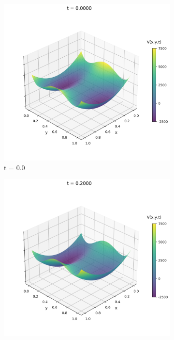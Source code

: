 \documentclass{article}
\theoremstyle{definition}
\theoremstyle{plain}
\theoremstyle{remark}
\begin{document}
\begin{figure}[h]
  \centering
  \begin{subfigure}[b]{0.3\textwidth}
    \centering
    \includegraphics[width=\textwidth, trim=0cm 0cm 0cm 1cm, clip]{figures/potential_frame_0000.png}
    \caption{t = 0.0}
  \end{subfigure}
  \hfill
  \begin{subfigure}[b]{0.3\textwidth}
    \centering
    \includegraphics[width=\textwidth, trim=0cm 0cm 0cm 1cm, clip]{figures/potential_frame_0010.png}

\end{subfigure}
\end{figure}
\end{document}
